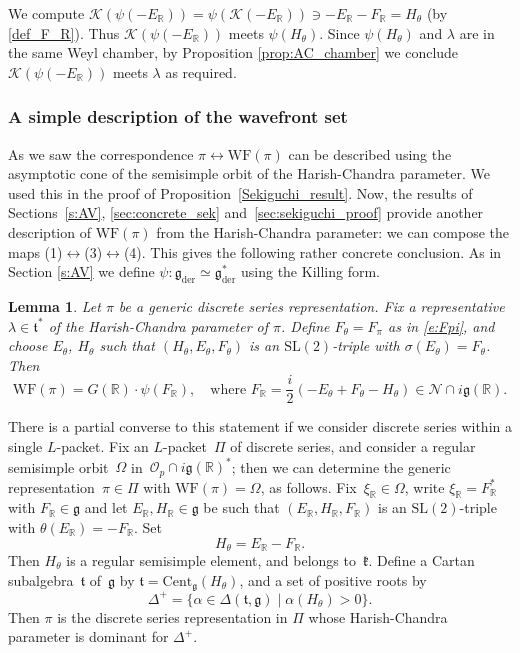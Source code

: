 \documentclass[10pt,leqno]{article}
\newtheorem{lemma}[equation]{Lemma}
\numberwithin{equation}{section}
\newcommand{\Cent}{\mathrm{Cent}}
\renewcommand{\O}{\mathcal O}
\newcommand{\R}{\mathbb R}
\newcommand{\N}{\mathcal N}
\newcommand{\K}{\mathcal K}
\renewcommand{\k}{\mathfrak k}
\renewcommand{\t}{\mathfrak t}
\newcommand{\g}{\mathfrak g}
\newcommand{\gder}{\mathfrak g_{\mathrm{der}}}
\newcommand{\WF}{\mathrm{WF}}
\newcommand{\Op}{\O_p}
\begin{document}
We compute $\K(\psi(-E_\R))=\psi(\K(-E_\R))\ni -E_\R-F_\R=H_\theta$ (by \eqref{def_F_R}).
Thus $\K(\psi(-E_\R))$ meets $\psi(H_\theta)$. 
Since  $\psi(H_{\theta})$ and $\lambda$ are in the same Weyl chamber, by Proposition \ref{prop:AC_chamber} we conclude 
$\K(\psi(-E_\R))$ meets $\lambda$ as required.

\subsubsection{A simple description of the wavefront set}\label{sec:alternate_WF}


As we saw the correspondence $\pi \leftrightarrow \WF(\pi)$ can be described using the asymptotic cone of the semisimple orbit of the Harish-Chandra parameter. We used this in the proof of Proposition~\ref{Sekiguchi_result}. Now, the results of Sections~\ref{s:AV}, \ref{sec:concrete_sek} and~\ref{sec:sekiguchi_proof} provide another description of $\WF(\pi)$ from the Harish-Chandra parameter: we can compose the maps (1)$\leftrightarrow$(3)$\leftrightarrow$(4). This gives the following rather concrete conclusion.
As in Section \ref{s:AV} we define $\psi:\gder\simeq \gder^*$ using the Killing form.  

\begin{lemma}\label{lem:explicit_WF}
  Let $\pi$ be a generic discrete series representation. Fix a representative  $\lambda\in \t^*$ of the Harish-Chandra parameter of $\pi$.
Define $F_\theta=F_\pi$ as in \eqref{e:Fpi}, and choose  $E_\theta$, $H_\theta$ such that $(H_\theta,E_\theta,F_\theta)$ is an $\mathrm{SL}(2)$-triple with $\sigma(E_\theta)=F_\theta$.  Then
$$
\WF(\pi)=G(\R)\cdot \psi(F_\R), \quad \text{where $F_\R = \frac i2(-E_\theta+F_\theta-H_\theta)\in\N\cap i\g(\R)$.}
$$\end{lemma}
There is a partial converse to this statement if we consider discrete series within a single $L$-packet. Fix an $L$-packet~$\Pi$ of discrete series, and consider a regular semisimple orbit~$\Omega$ in~$\Op \cap i\g(\R)^\ast$; then we can determine the generic representation~$\pi \in \Pi$ with $\WF(\pi)=\Omega$, as follows. Fix~$\xi_\R \in \Omega$, write $\xi_\R=F_\R^\ast$ with $F_\R \in \g$ and let $E_\R, H_\R \in \g$ be such that $(E_\R, H_\R, F_\R)$ is an  $\mathrm{SL}(2)$-triple with $\theta(E_\R)=-F_\R$. Set
$$
H_\theta=E_\R-F_\R.
$$
Then $H_\theta$ is a regular semisimple element, and belongs to~$\k$.
Define a Cartan subalgebra~$\t$ of~$\g$ by $\t=\Cent_{\g}(H_\theta)$, and a set of positive roots by
$$
\Delta^+=\{\alpha\in\Delta(\t,\g)\mid  \alpha(H_\theta)>0\}.
$$
Then $\pi$ is the discrete series representation in $\Pi$ whose Harish-Chandra parameter is dominant for $\Delta^+$. 
\end{document}
